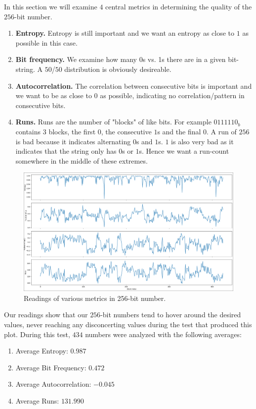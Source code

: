 In this section we will examine \(4\) central metrics in 
determining the quality of the \(256\)-bit number. 
\begin{enumerate}
    \item \textbf{Entropy.} Entropy is still important and 
        we want an entropy as close to \(1\) as possible in 
        this case. 
    \item \textbf{Bit frequency.} We examine how many 0s vs. 1s 
        there are in a given bit-string. A \(50\)/\(50\) 
        distribution is obviously desireable.
    \item \textbf{Autocorrelation.} The correlation between 
        consecutive bits is important and we want 
        to be as close to \(0\) as possible, indicating 
        no correlation/pattern in consecutive bits.
    \item \textbf{Runs.} Runs are the number of "blocks" of like 
        bits. For example \(0111110_b\) contains \(3\) blocks, 
        the first \(0\), the consecutive \(1\)s and the final 
        \(0\). A run of \(256\) is bad because it indicates 
        alternating \(0\)s and \(1\)s. \(1\) is also very bad 
        as it indicates that the string only has \(0\)s or \(1\)s.
        Hence we want a run-count somewhere in the middle of these 
        extremes.
\end{enumerate}

\begin{figure}[h]
    \centering
    \includegraphics[width=0.9\linewidth]{./images/256SUITE_PLOT.png} 
    \caption{Readings of various metrics in 256-bit number.}
    \label{fig:256_suite}
\end{figure}

Our readings show that our \(256\)-bit numbers tend to 
hover around the desired values, never reaching any 
disconcerting values during the test that produced this 
plot. During this test, \(434\) numbers were analyzed with 
the following averages: 
\begin{enumerate}
    \item Average Entropy: \(0.987\) 
    \item Average Bit Frequency: \(0.472\)
    \item Average Autocorrelation: \(-0.045\) 
    \item Average Runs: \(131.990\)
\end{enumerate}

